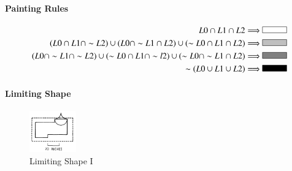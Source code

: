\documentclass[11pt, a4paper]{report}
\begin{document}
\paragraph{Painting Rules}
\begin{align}
    \label{fig:Shape Grammars/Shape Specification/Painting_Rule_1}
    L0\cap L1\cap L2 \Longrightarrow  
    \begin{tikzpicture}
        \filldraw[fill=black!00!white, draw=black] (0,0) rectangle (1,0.25);
    \end{tikzpicture} \\
    \label{fig:Shape Grammars/Shape Specification/Painting_Rule_2}
    (L0\cap L1\cap \sim L2)\cup (L0\cap \sim L1\cap L2)\cup (\sim L0\cap L1 \cap L2) \Longrightarrow  
    \begin{tikzpicture}
        \filldraw[fill=black!25!white, draw=black] (0,0) rectangle (1,0.25);
    \end{tikzpicture} \\
    \label{fig:Shape Grammars/Shape Specification/Painting_Rule_3}
    (L0\cap \sim L1\cap \sim L2)\cup (\sim L0\cap L1\cap \sim l2)\cup (\sim L0\cap \sim L1 \cap L2) \Longrightarrow  
    \begin{tikzpicture}
        \filldraw[fill=black!50!white, draw=black] (0,0) rectangle (1,0.25);
    \end{tikzpicture} \\
    \label{fig:Shape Grammars/Shape Specification/Painting_Rule_4}
    \sim (L0\cup L1\cup L2)  \Longrightarrow  
    \begin{tikzpicture}
        \filldraw[fill=black!100!white, draw=black] (0,0) rectangle (1,0.25);
    \end{tikzpicture}
\end{align}
\paragraph{Limiting Shape}
\begin{figure}[!h]
    \centering
    \includegraphics[width=2cm]{sg_specification_Limiting_shape.jpg}
    \caption{ Limiting Shape I \citep{shapeGrammars:1972}}\label{fig:Shape Grammars/Shape Specification/Limiting_Shape}
\end{figure}
\pagebreak
\end{document}
